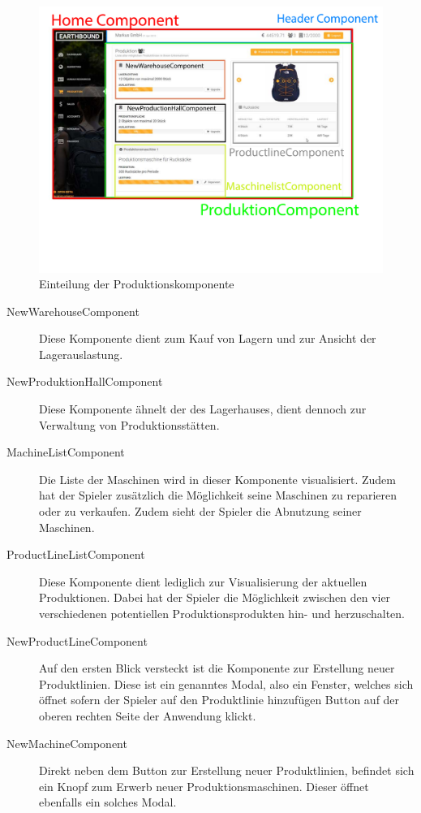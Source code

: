 \begin{figure}[h]
	\centering	\includegraphics[width=\textwidth]{img/angular2_aufbau2}
	\captionsetup{format=hang}
	\caption{
		\label{abb:productioncomponent}Einteilung der Produktionskomponente }
\end{figure}
\begin{description}
	\item[NewWarehouseComponent] Diese Komponente dient zum Kauf von Lagern und zur Ansicht der Lagerauslastung.
	\item[NewProduktionHallComponent] Diese Komponente ähnelt der des Lagerhauses, dient dennoch zur Verwaltung von Produktionsstätten.
	\item[MachineListComponent] Die Liste der Maschinen wird in dieser Komponente visualisiert. Zudem hat der Spieler zusätzlich die Möglichkeit seine Maschinen zu reparieren oder zu verkaufen. Zudem sieht der Spieler die Abnutzung seiner Maschinen.
	\item[ProductLineListComponent] Diese Komponente dient lediglich zur Visualisierung der aktuellen Produktionen. Dabei hat der Spieler die Möglichkeit zwischen den vier verschiedenen potentiellen Produktionsprodukten hin- und herzuschalten.
	\item[NewProductLineComponent] Auf den ersten Blick versteckt ist die Komponente zur Erstellung neuer Produktlinien. Diese ist ein genanntes Modal, also ein Fenster, welches sich öffnet sofern der Spieler auf den Produktlinie hinzufügen Button auf der oberen rechten Seite der Anwendung klickt.
	\item[NewMachineComponent] Direkt neben dem Button zur Erstellung neuer Produktlinien, befindet sich ein Knopf zum Erwerb neuer Produktionsmaschinen. Dieser öffnet ebenfalls ein solches Modal. 
\end{description}


